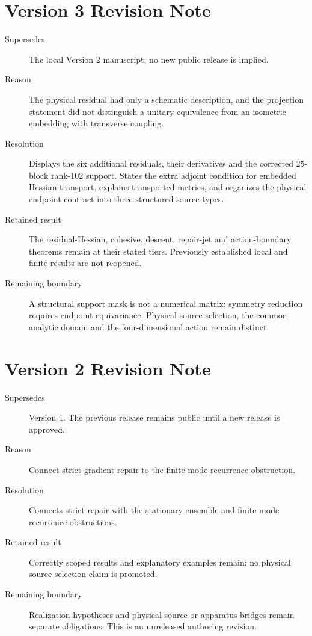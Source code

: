 \documentclass[11pt,a4paper]{article}
\begin{document}
\section*{Version 3 Revision Note}
\begin{description}
\item[Supersedes] The local Version 2 manuscript; no new public release is implied.
\item[Reason] The physical residual had only a schematic description, and the
projection statement did not distinguish a unitary equivalence from an isometric
embedding with transverse coupling.
\item[Resolution] Displays the six additional residuals, their derivatives and
the corrected 25-block rank-102 support. States the extra adjoint condition for
embedded Hessian transport, explains transported metrics, and organizes the
physical endpoint contract into three structured source types.
\item[Retained result] The residual-Hessian, cohesive, descent, repair-jet and
action-boundary theorems remain at their stated tiers. Previously established
local and finite results are not reopened.
\item[Remaining boundary] A structural support mask is not a numerical matrix;
symmetry reduction requires endpoint equivariance. Physical source selection,
the common analytic domain and the four-dimensional action remain distinct.
\end{description}

\section*{Version 2 Revision Note}
\begin{description}
\item[Supersedes] Version 1. The previous release remains public until a new release is approved.
\item[Reason] Connect strict-gradient repair to the finite-mode recurrence obstruction.
\item[Resolution] Connects strict repair with the stationary-ensemble and finite-mode recurrence obstructions.
\item[Retained result] Correctly scoped results and explanatory examples remain; no physical source-selection claim is promoted.
\item[Remaining boundary] Realization hypotheses and physical source or apparatus bridges remain separate obligations. This is an unreleased authoring revision.
\end{description}
\end{document}
